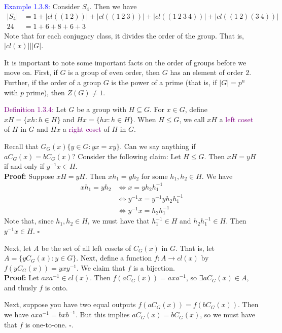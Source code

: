 \documentclass{article}
\begin{document}
\textcolor{blue}{Example 1.3.8:} Consider $S_4$. Then we have 
\begin{align*}
    |S_4| &= 1+|cl((1 \ 2))|+|cl((1 \ 2 \ 3))|+|cl((1 \ 2 \ 3 \ 4))|+|cl((1 \ 2)(3 \ 4))| \\
    24 &= 1 + 6 + 8 + 6 + 3
\end{align*}
Note that for each conjugacy class, it divides the order of the group. That is, $|cl(x)| \big| |G|$. 

It is important to note some important facts on the order of groups before we move on. First, if $G$ is a group of even order, then $G$ 
has an element of order $2$. Further, if the order of a group $G$ is the power of a prime (that is, if $|G| = p^n$ with $p$ prime), then 
$Z(G) \neq 1$.

\textcolor{purple}{Definition 1.3.4:} Let $G$ be a group with $H \subseteq G$. For $x \in G$, define $xH = \{xh: h \in H\}$ and 
$Hx = \{hx: h \in H\}$. When $H \leq G$, we call $xH$ a \textcolor{purple}{left coset} of $H$ in $G$ and $Hx$ a 
\textcolor{purple}{right coset} of $H$ in $G$. 

Recall that $G_G(x) \{y \in G: yx=xy\}$. Can we say anything if $aC_G(x) = bC_G(x)$? Consider the following claim:
Let $H \leq G$. Then $xH=yH$ if and only if $y^{-1}x \in H$.\\
\textbf{Proof:} Suppose $xH=yH$. Then $xh_1=yh_2$ for some $h_1,h_2 \in H$. We have
\begin{align*}
    xh_1 = yh_2 &\Longleftrightarrow x=yh_2h_1^{-1} \\
    &\Longleftrightarrow y^{-1}x = y^{-1}yh_2h_1^{-1} \\
    &\Longleftrightarrow y^{-1}x=h_2h_1^{-1}
\end{align*}
Note that, since $h_1,h_2 \in H$, we must have that $h_1^{-1} \in H$ and $h_2h_1^{-1}\in H$. Then $y^{-1}x\in H$. $\square$

Next, let $A$ be the set of all left cosets of $C_G(x)$ in $G$. That is, let $A = \{yC_G(x):y \in G\}$. Next, define a function 
$f: A \longrightarrow cl(x)$ by $f(yC_G(x)) = yxy^{-1}$. We claim that $f$ is a bijection.\\

\textbf{Proof:} Let $axa^{-1}\in cl(x)$. Then $f(aC_G(x)) = axa^{-1}$, so $\exists aC_G(x) \in A$, and thusly $f$ is onto.

Next, suppose you have two equal outputs $f(aC_G(x))=f(bC_G(x))$. Then we have $axa^{-1}=bxb^{-1}$. But this implies $aC_G(x)=bC_G(x)$, so 
we must have that $f$ is one-to-one. $\square$.
\end{document}
